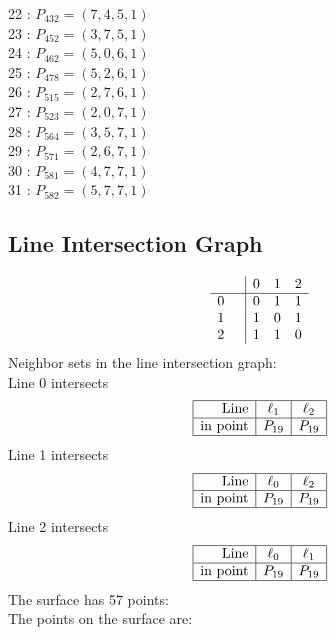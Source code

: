 \documentclass{article}
\begin{document}
{\begin{multicols}{2}
22 : $P_{432}=( 7, 4, 5, 1 )$\\
23 : $P_{452}=( 3, 7, 5, 1 )$\\
24 : $P_{462}=( 5, 0, 6, 1 )$\\
25 : $P_{478}=( 5, 2, 6, 1 )$\\
26 : $P_{515}=( 2, 7, 6, 1 )$\\
27 : $P_{523}=( 2, 0, 7, 1 )$\\
28 : $P_{564}=( 3, 5, 7, 1 )$\\
29 : $P_{571}=( 2, 6, 7, 1 )$\\
30 : $P_{581}=( 4, 7, 7, 1 )$\\
31 : $P_{582}=( 5, 7, 7, 1 )$\\
\end{multicols}
\subsection*{Line Intersection Graph}
{\arraycolsep=1pt
$$
\begin{array}{rr|*{3}r}
 &  & 0 & 1 & 2\\
\hline
0 &  & 0 & 1 & 1\\
1 &  & 1 & 0 & 1\\
2 &  & 1 & 1 & 0\\
\end{array}
$$
}%
Neighbor sets in the line intersection graph:\\
Line 0 intersects 
$$
\begin{array}{|r*{2}{|c}|}
\hline
\mbox{Line}  & \ell_{1} & \ell_{2}\\
\hline
\mbox{in point}  & P_{19} & P_{19}\\
\hline
\end{array}
$$
Line 1 intersects 
$$
\begin{array}{|r*{2}{|c}|}
\hline
\mbox{Line}  & \ell_{0} & \ell_{2}\\
\hline
\mbox{in point}  & P_{19} & P_{19}\\
\hline
\end{array}
$$
Line 2 intersects 
$$
\begin{array}{|r*{2}{|c}|}
\hline
\mbox{Line}  & \ell_{0} & \ell_{1}\\
\hline
\mbox{in point}  & P_{19} & P_{19}\\
\hline
\end{array}
$$
The surface has 57 points:\\
The points on the surface are:\\
\begin{multicols}{3}

\end{multicols}}
\end{document}
